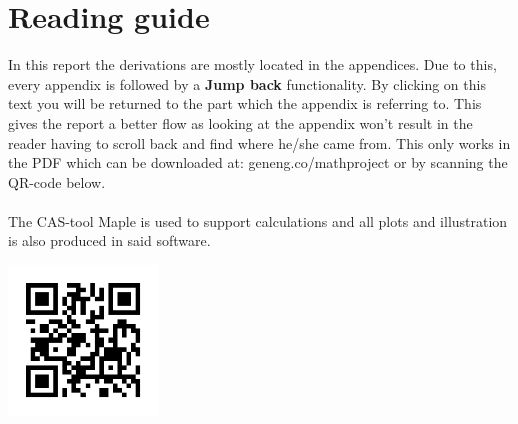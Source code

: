\documentclass{article}
\numberwithin{equation}{section} %
\begin{document}
\section*{Reading guide}
In this report the derivations are mostly located in the appendices. Due to this, every appendix is followed by a \textbf{Jump back} functionality. By clicking on this text you will be returned to the part which the appendix is referring to. This gives the report a better flow as looking at the appendix won't result  in the reader having to scroll back and find where he/she came from. This only works in the PDF which can be downloaded at: geneng.co/mathproject or by scanning the QR-code below.\\
\\
The CAS-tool Maple is used to support calculations and all plots and illustration is also produced in said software.\\
[5cm]
\begin{center}
\includegraphics[width=4cm]{pictures/qrcode.png}
\end{center}


\newpage


\cleardoublepage
%

\listoffigures
\listoftables
\thispagestyle{empty} %
\newpage
\thispagestyle{empty} %
\tableofcontents 
\thispagestyle{empty} %
\cleardoublepage
\setcounter{page}{1}
%


\end{document}
